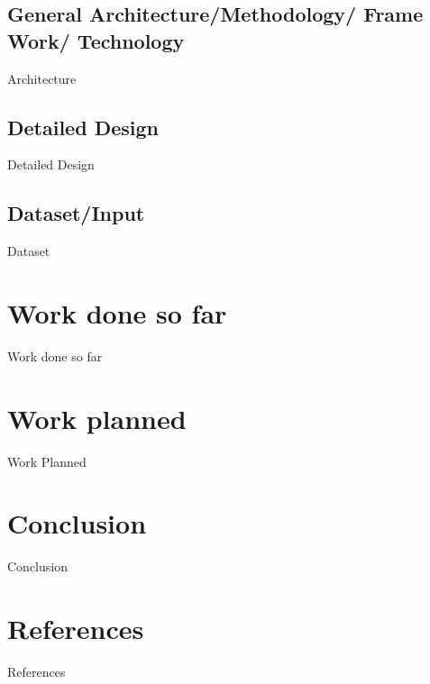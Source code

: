\documentclass{beamer}
\begin{document}

\subsection{General Architecture/Methodology/ Frame Work/ Technology}
\begin{frame}{Architecture}
\end{frame}

\subsection{Detailed Design}
\begin{frame}{Detailed Design}
\end{frame}

\subsection{Dataset/Input}
\begin{frame}{Dataset}
\end{frame}


\section{Work done so far}
\begin{frame}{Work done so far}
\end{frame}


\section{Work planned}
\begin{frame}{Work Planned}
\end{frame}


\section{Conclusion}
\begin{frame}{Conclusion}
\end{frame}


\section{References}
\begin{frame}{References}
	\nocite{*}
	
	
\end{frame}

\end{document}
